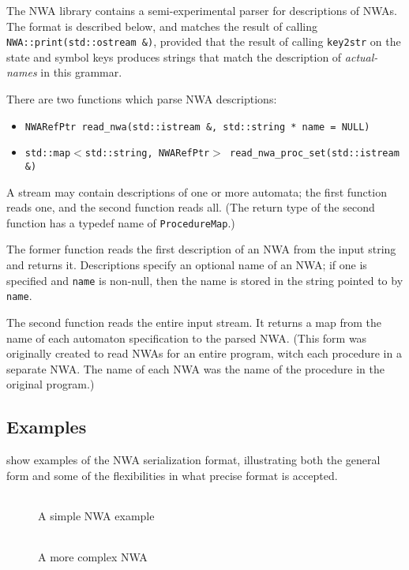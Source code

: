 The NWA library contains a semi-experimental parser for descriptions of
NWAs. The format is described below, and matches the result of calling
\texttt{NWA::print(std::ostream \&)}, provided that the result of
calling \texttt{key2str} on the state and symbol keys produces strings
that match the description of \textsl{actual-names} in this grammar.

There are two functions which parse NWA descriptions:
\begin{itemize}
  \item\texttt{NWARefPtr read\_nwa(std::istream \&, std::string * name = NULL)}
  \item\texttt{std::map$<$std::string, NWARefPtr$>$ read\_nwa\_proc\_set(std::istream \&)}
\end{itemize}
A stream may contain descriptions of one or more automata; the first
function reads one, and the second function reads all.  (The return
type of the second function has a typedef name of
\texttt{ProcedureMap}.)

The former function reads the first description of an NWA from the
input string and returns it. Descriptions specify an optional name of
an NWA; if one is specified and \texttt{name} is non-null, then the
name is stored in the string pointed to by \texttt{name}.

The second function reads the entire input stream. It returns a map
from the name of each automaton specification to the parsed NWA. (This
form was originally created to read NWAs for an entire program, witch
each procedure in a separate NWA. The name of each NWA was the name of
the procedure in the original program.)

\subsection{Examples}

 show examples of the NWA serialization format, illustrating
both the general form and some of the flexibilities in what precise
format is accepted.

\begin{figure}
  \centering
  \begin{tabular}{|p{1.75in}|}
    
  \end{tabular}
  \caption{A simple NWA example}
  \label{Fi:nwa-simple}
\end{figure}

\begin{figure}
  \centering
  \begin{tabular}{|p{5.5in}|}
    
  \end{tabular}
  \caption {A more complex NWA}
  \label{Fi:nwa-mattf}
\end{figure}

